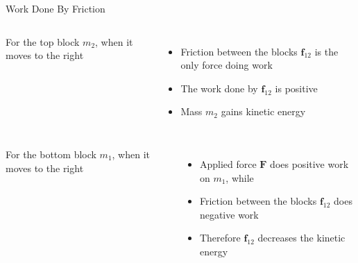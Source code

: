 \documentclass[12pt,compress,aspectratio=169]{beamer}
\begin{document}
\begin{frame}{Work Done By Friction}
  \begin{columns}
    \centering

    For the top block $m_2$, when it moves to the right
    \begin{itemize}
    \item Friction between the blocks $\bm f_{12}$ is the only force doing work
    \item The work done by $\bm f_{12}$ is positive
    \item Mass $m_2$ gains kinetic energy
    \end{itemize}
  \end{columns}
  \begin{columns}
    For the bottom block $m_1$, when it moves to the right
    \begin{itemize}
    \item Applied force $\bm F$ does positive work on $m_1$, while
    \item Friction between the blocks $\bm f_{12}$ does negative work
    \item Therefore $\bm f_{12}$ decreases the kinetic energy
    \end{itemize}
    
    \centering
  \end{columns}
\end{frame}
\end{document}
